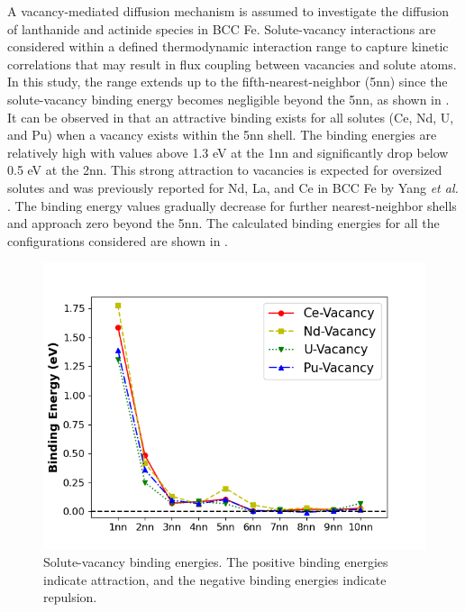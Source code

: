 \documentclass[preprint,12pt]{elsarticle}
\begin{document}
A vacancy-mediated diffusion mechanism is assumed to investigate the diffusion of lanthanide and actinide species in BCC Fe. Solute-vacancy interactions are considered within a defined thermodynamic interaction range to capture kinetic correlations that may result in flux coupling between vacancies and solute atoms. In this study, the range extends up to the fifth-nearest-neighbor (5nn) since the solute-vacancy binding energy becomes negligible beyond the 5nn, as shown in . It can be observed in  that an attractive binding exists for all solutes (Ce, Nd, U, and Pu) when a vacancy exists within the 5nn shell. The binding energies are relatively high with values above 1.3 eV at the 1nn and significantly drop below 0.5 eV at the 2nn. This strong attraction to vacancies is expected for oversized solutes and was previously reported for Nd, La, and Ce in BCC Fe by Yang \textit{et al.} \cite{yang_significant_2023}. The binding energy values gradually decrease for further nearest-neighbor shells and approach zero beyond the 5nn. The calculated binding energies for all the configurations considered are shown in .

\begin{figure}[h!]
    \centering
    \includegraphics[width=0.99\linewidth]{BE.png}
    \caption{Solute-vacancy binding energies. The positive binding energies indicate attraction, and the negative binding energies indicate repulsion.}
    \label{fig:binding_energies}
\end{figure}
\end{document}
